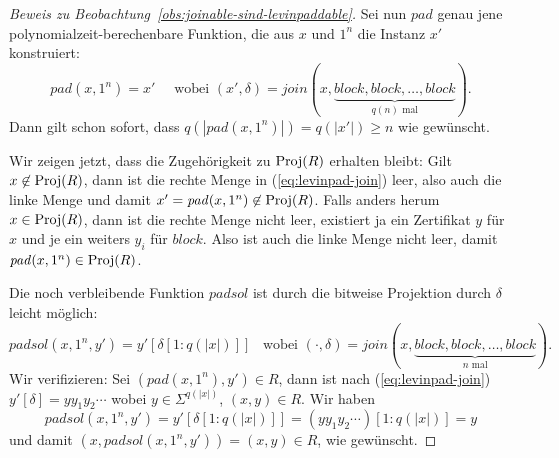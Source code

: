 \begin{proof}[Beweis zu Beobachtung~\ref{obs:joinable-sind-levinpaddable}]
    Sei nun $\mathit{pad}$ genau jene polynomialzeit-berechenbare Funktion, die aus $x$ und $1^n$ die Instanz $x'$ konstruiert:
    \[ \mathit{pad}(x, 1^n) = x' \quad\text{ wobei }
    (x',\delta)=\mathit{join}(x, \underbrace{\mathit{block}, \mathit{block}, \ldots, \mathit{block}}_{\text{$q(n)$ mal}}).\]
    Dann gilt schon sofort, dass $q(|\mathit{pad}(x, 1^n)|)=q(|x'|)\geq n$ wie gewünscht.

    Wir zeigen jetzt, dass die Zugehörigkeit zu $\operatorname{Proj}(R)$ erhalten bleibt:
    Gilt $x\not\in\operatorname{Proj}(R)$, dann ist die rechte Menge in (\ref{eq:levinpad-join}) leer, also auch die linke Menge und damit $x'=\mathit{pad}(x, 1^n)\not\in \operatorname{Proj}(R)$.
    Falls anders herum $x\in\operatorname{Proj}(R)$, dann ist die rechte Menge nicht leer, existiert ja ein Zertifikat $y$ für $x$ und je ein weiters $y_i$ für $\mathit{block}$. Also ist auch die linke Menge nicht leer, damit $\mathit{pad}(x, 1^n)\in \operatorname{Proj}(R)$.

    Die noch verbleibende Funktion $\mathit{padsol}$ ist durch die bitweise Projektion durch $\delta$ leicht möglich:
    \[
        \mathit{padsol}(x, 1^n, y') = y'[\delta[1:q(|x|)]] \enspace\text{ wobei } (\cdot, \delta) = \mathit{join}(x, \underbrace{\mathit{block}, \mathit{block}, \ldots, \mathit{block}}_{\text{$n$ mal}}).\]
    Wir verifizieren: Sei $(\mathit{pad}(x, 1^n), y')\in R$, dann ist nach (\ref{eq:levinpad-join}) $y'[\delta]=yy_1y_2\cdots$ wobei $y\in\Sigma^{q(|x|)}$, $(x, y)\in R$. 
    Wir haben
    \[ \mathit{padsol}(x, 1^n, y') = y'[\delta[1:q(|x|)]] = (yy_1y_2\cdots)[1:q(|x|)] = y \]
    und damit $(x, \mathit{padsol}(x, 1^n, y')) = (x, y)\in R$, wie gewünscht.
\end{proof}

